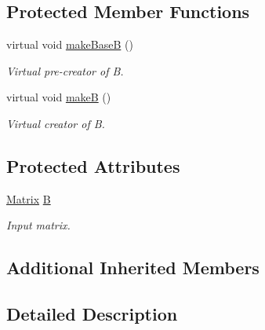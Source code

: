 \subsection*{Protected Member Functions}
\begin{DoxyCompactItemize}
\item 
\mbox{\label{classKalman_1_1KFilter_ad829fa98bfde372eddd58a101d77c2a5}} 
virtual void \mbox{\hyperlink{classKalman_1_1KFilter_ad829fa98bfde372eddd58a101d77c2a5}{make\+BaseB}} ()
\begin{DoxyCompactList}\small\item\em Virtual pre-\/creator of {\itshape B}. \end{DoxyCompactList}\item 
\mbox{\label{classKalman_1_1KFilter_a7bb1962fff6c84f050f4b7b619d86eaf}} 
virtual void \mbox{\hyperlink{classKalman_1_1KFilter_a7bb1962fff6c84f050f4b7b619d86eaf}{makeB}} ()
\begin{DoxyCompactList}\small\item\em Virtual creator of {\itshape B}. \end{DoxyCompactList}\end{DoxyCompactItemize}
\subsection*{Protected Attributes}
\begin{DoxyCompactItemize}
\item 
\mbox{\label{classKalman_1_1KFilter_a2b5e6370290db24411a8b4ce3ecf7eb9}} 
\mbox{\hyperlink{classKalman_1_1EKFilter_a7cbc4cb4d9139a7f241b27110426af43}{Matrix}} \mbox{\hyperlink{classKalman_1_1KFilter_a2b5e6370290db24411a8b4ce3ecf7eb9}{B}}
\begin{DoxyCompactList}\small\item\em Input matrix. \end{DoxyCompactList}\end{DoxyCompactItemize}
\subsection*{Additional Inherited Members}


\subsection{Detailed Description}
